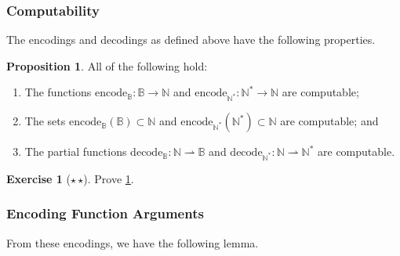 \documentclass[11pt,a4paper,reqno]{amsart}
\theoremstyle{plain}
\theoremstyle{definition}
\newtheorem{proposition}[theorem]{Proposition}
\theoremstyle{definition}
\newtheorem{exercise}[theorem]{Exercise}
\newcommand\exerciseLevelMedium{$\star${\,}$\star$}
\begin{document}
\subsubsection{Computability}

The encodings and decodings as defined above have the following properties.

\begin{proposition}\label{prop:encodeing-as-nats}
  All of the following hold:
  \begin{enumerate}
    \item The functions $\mathrm{encode}_{\mathbb B}\colon \mathbb B\to\mathbb N$ and $\mathrm{encode}_{\mathbb N^*}\colon\mathbb N^*\to\mathbb N$ are computable;
    \item The sets $\mathrm{encode}_{\mathbb B}(\mathbb B)\subset \mathbb N$ and $\mathrm{encode}_{\mathbb N^*}(\mathbb N^*)\subset \mathbb N$ are computable; and
    \item The partial functions $\mathrm{decode}_{\mathbb B}\colon \mathbb N\rightharpoonup\mathbb B$ and $\mathrm{decode}_{\mathbb N^*}\colon \mathbb N \rightharpoonup \mathbb N^*$ are computable.
  \end{enumerate}
\end{proposition}

\begin{exercise}[\exerciseLevelMedium]
  Prove \cref{prop:encodeing-as-nats}.
\end{exercise}

\subsubsection{Encoding Function Arguments}

From these encodings, we have the following lemma.
\end{document}

